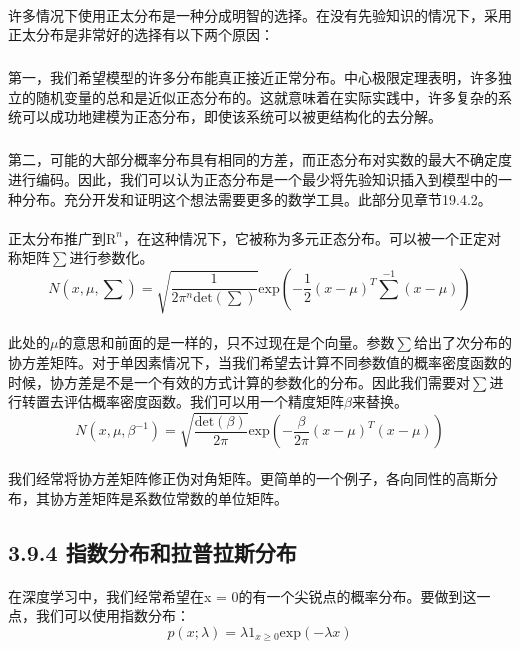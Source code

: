 \documentclass{article}
\begin{document}
    \paragraph{}
    许多情况下使用正太分布是一种分成明智的选择。在没有先验知识的情况下，采用正太分布是非常好的选择有以下两个原因：
    \subparagraph{}
    第一，我们希望模型的许多分布能真正接近正常分布。中心极限定理表明，许多独立的随机变量的总和是近似正态分布的。这就意味着在实际实践中，许多复杂的系统可以成功地建模为正态分布，即使该系统可以被更结构化的去分解。
    \subparagraph{}
    第二，可能的大部分概率分布具有相同的方差，而正态分布对实数的最大不确定度进行编码。因此，我们可以认为正态分布是一个最少将先验知识插入到模型中的一种分布。充分开发和证明这个想法需要更多的数学工具。此部分见章节19.4.2。
    \paragraph{}
    正太分布推广到$\mathrm{R}^{n}$，在这种情况下，它被称为多元正态分布。可以被一个正定对称矩阵$\sum$进行参数化。
    \begin{equation}
      N(x,\mu,\sum)=\sqrt{\frac{1}{2\pi^{n}\mathrm{det}(\sum)}}\mathrm{exp}(-\frac{1}{2}(x-\mu)^{T}\sum^{-1}(x-\mu))  \tag{3.23}
    \end{equation}
    \paragraph{}
    此处的$\mu$的意思和前面的是一样的，只不过现在是个向量。参数$\sum$给出了次分布的协方差矩阵。对于单因素情况下，当我们希望去计算不同参数值的概率密度函数的时候，协方差是不是一个有效的方式计算的参数化的分布。因此我们需要对$\sum$进行转置去评估概率密度函数。我们可以用一个精度矩阵$\beta$来替换。
    \begin{equation}
      N(x,\mu,\beta^{-1})=\sqrt{\frac{\mathrm{det}(\beta)}{2\pi}}\mathrm{exp}(-\frac{\beta}{2\pi}(x-\mu)^{T}(x-\mu))  \tag{3.24}
    \end{equation}
    \paragraph{}
    我们经常将协方差矩阵修正伪对角矩阵。更简单的一个例子，各向同性的高斯分布，其协方差矩阵是系数位常数的单位矩阵。
    \subsection*{3.9.4 指数分布和拉普拉斯分布}
    \paragraph{}
    在深度学习中，我们经常希望在x = 0的有一个尖锐点的概率分布。要做到这一点，我们可以使用指数分布：
    \begin{equation}
      p(x;\lambda)=\lambda1_{x\geq0}\mathrm{exp}(-\lambda x)  \tag{3.25}
    \end{equation}
\end{document}
